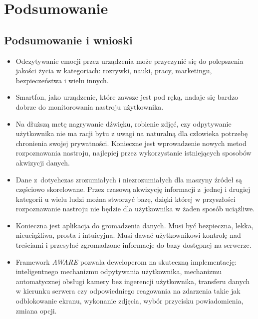 \chapter{Podsumowanie}
\label{cha:podsumowanie}



\section{Podsumowanie i wnioski}
\label{sec:podsumowanieIWnioski}


\begin{itemize}
	\item Odczytywanie emocji przez urządzenia może przyczynić się do polepszenia jakości życia w kategoriach: rozrywki, nauki, pracy, marketingu, bezpieczeństwa i wielu innych.
	
	\item Smartfon, jako urządzenie, które zawsze jest pod ręką, nadaje się bardzo dobrze do monitorowania nastroju użytkownika.
	
	\item Na dłuższą metę nagrywanie dźwięku, robienie zdjęć, czy odpytywanie użytkownika nie ma racji bytu z uwagi na naturalną dla człowieka potrzebę chronienia swojej prywatności. Konieczne jest wprowadzenie nowych metod rozpoznawania nastroju, najlepiej przez wykorzystanie istniejących sposobów akwizycji danych.
	
	\item Dane z~dotychczas zrozumiałych i niezrozumiałych dla maszyny źródeł są częściowo skorelowane. Przez czasową akwizycję informacji z~jednej i drugiej kategorii u wielu ludzi można stworzyć bazę, dzięki której w przyszłości rozpoznawanie nastroju nie będzie dla użytkownika w żaden sposób uciążliwe.
	
	\item Konieczna jest aplikacja do gromadzenia danych. Musi być bezpieczna, lekka, nieuciążliwa, prosta i intuicyjna. Musi dawać użytkownikowi kontrolę nad treściami i przesyłać zgromadzone informacje do bazy dostępnej na serwerze.
	
	\item Framework \textit{AWARE} pozwala deweloperom na skuteczną implementację: inteligentnego mechanizmu odpytywania użytkownika, mechanizmu automatycznej obsługi kamery bez ingerencji użytkownika, transferu danych w kierunku serwera czy odpowiedniego reagowania na zdarzenia takie jak odblokowanie ekranu, wykonanie zdjęcia, wybór przycisku powiadomienia, zmiana opcji.
\end{itemize}
\clearpage


